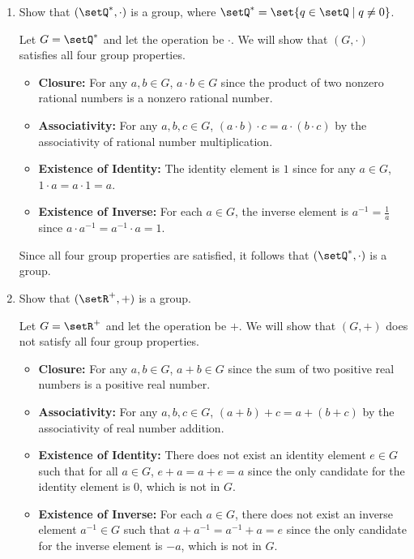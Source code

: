 \begin{enumerate}
\begin{subprove}
  \end{subprove}
  \item Show that \((\setQ^*, \cdot)\) is a group, where \(\setQ^* = \set{q \in \setQ \mid q \neq 0}\).
  \begin{subprove}
    Let \(G = \setQ^*\) and let the operation be \(\cdot\).
    We will show that \((G, \cdot)\) satisfies all four group properties.
    \begin{itemize}
      \item \textbf{Closure:} For any \(a, b \in G\), \(a \cdot b \in G\) since the product of two nonzero rational numbers is a nonzero rational number.
      \item \textbf{Associativity:} For any \(a, b, c \in G\), \((a \cdot b) \cdot c = a \cdot (b \cdot c)\) by the associativity of rational number multiplication.
      \item \textbf{Existence of Identity:} The identity element is \(1\) since for any \(a \in G\), \(1 \cdot a = a \cdot 1 = a\).
      \item \textbf{Existence of Inverse:} For each \(a \in G\), the inverse element is \(a^{-1} = \frac{1}{a}\) since \(a \cdot a^{-1} = a^{-1} \cdot a = 1\).
    \end{itemize}
    Since all four group properties are satisfied, it follows that \((\setQ^*, \cdot)\) is a group.
  \end{subprove}
  \item Show that \((\setR^{+}, +)\) is a group.
  \begin{subprove}
    Let \(G = \setR^{+}\) and let the operation be \(+\).
    We will show that \((G, +)\) does not satisfy all four group properties.
    \begin{itemize}
      \item \textbf{Closure:} For any \(a, b \in G\), \(a + b \in G\) since the sum of two positive real numbers is a positive real number.
      \item \textbf{Associativity:} For any \(a, b, c \in G\), \((a + b) + c = a + (b + c)\) by the associativity of real number addition.
      \item \textbf{Existence of Identity:} There does not exist an identity element \(e \in G\) such that for all \(a \in G\), \(e + a = a + e = a\) since the only candidate for the identity element is \(0\), which is not in \(G\).
      \item \textbf{Existence of Inverse:} For each \(a \in G\), there does not exist an inverse element \(a^{-1} \in G\) such that \(a + a^{-1} = a^{-1} + a = e\) since the only candidate for the inverse element is \(-a\), which is not in \(G\).

\end{itemize}
\end{subprove}
\end{enumerate}
